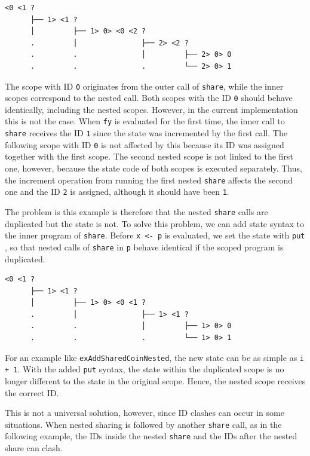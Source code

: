\documentclass[a4paper, 11pt, fleqn, twoside, abstract=on]{scrreprt}
\newcommand{\hinl}[1]{\texttt{#1}}
\begin{document}
\begin{verbatim}
<0 <1 ? 
      ├── 1> <1 ? 
      │         ├── 1> 0> <0 <2 ? 
      .         │               ├── 2> <2 ? 
      .         .               │         ├── 2> 0> 0
      .         .               .         └── 2> 0> 1
\end{verbatim}

The scope with ID \hinl{0} originates from the outer call of \hinl{share}, while the inner scopes correspond to the nested call.
Both scopes with the ID \hinl{0} should behave identically, including the nested scopes.
However, in the current implementation this is not the case.
When \hinl{fy} is evaluated for the first time, the inner call to \hinl{share} receives the ID \hinl{1} since the state was incremented by the first call.
The following scope with ID \hinl{0} is not affected by this because its ID was assigned together with the first scope.
The second nested scope is not linked to the first one, however, because the state code of both scopes is executed separately.
Thus, the increment operation from running the first nested \hinl{share} affects the second one and the ID \hinl{2} is assigned, although it should have been \hinl{1}.

The problem is this example is therefore that the nested \hinl{share} calls are duplicated but the state is not.
To solve this problem, we can add state syntax to the inner program of \hinl{share}.
Before \hinl{x <- p} is evaluated, we set the state with \hinl{put} , so that nested calls of \hinl{share} in \hinl{p} behave identical if the scoped program is duplicated.

\begin{verbatim}
<0 <1 ? 
      ├── 1> <1 ? 
      │         ├── 1> 0> <0 <1 ? 
      .         │               ├── 1> <1 ? 
      .         .               │         ├── 1> 0> 0
      .         .               .         └── 1> 0> 1
\end{verbatim}
\noindent
For an example like \hinl{exAddSharedCoinNested}, the new state can be as simple as \hinl{i + 1}.
With the added \hinl{put} syntax, the state within the duplicated scope is no longer different to the state in the original scope.
Hence, the nested scope receives the correct ID.

This is not a universal solution, however, since ID clashes can occur in some situations.
When nested sharing is followed by another \hinl{share} call, as in the following example, the IDs inside the nested \hinl{share} and the IDs after the nested share can clash.
\end{document}
